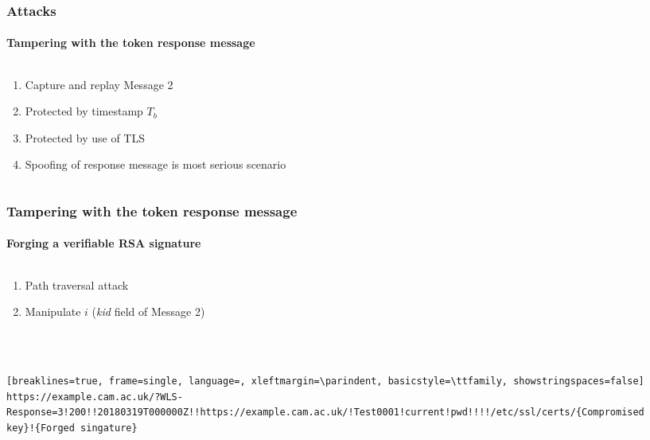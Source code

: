 \documentclass[handout, aspectratio=169, notes=hide]{beamer}
\begin{document}

\begin{frame}
\frametitle{Attacks}
\framesubtitle{Tampering with the token response message}
\setlength{\parskip}{1.0em}
\begin{columns}[T]
\begin{column}[T]{1.0\textwidth}	
\setlength{\parskip}{1.0em}

\begin{enumerate}
\setlength{\parskip}{1.0em}
\item Capture and replay Message 2
\item Protected by timestamp $T_b$
\item Protected by use of TLS
\item Spoofing of response message is most serious scenario
\end{enumerate}
\end{column}

\begin{column}[T]{0.0\textwidth}
\end{column}
\end{columns}

\end{frame}
\note{
}


\begin{frame}[fragile]
\frametitle{Tampering with the token response message}
\framesubtitle{Forging a verifiable RSA signature}
\setlength{\parskip}{1.0em}
\begin{columns}[T]
\begin{column}[T]{1.0\textwidth}	
\setlength{\parskip}{1.0em}

\begin{enumerate}
\setlength{\parskip}{1.0em}
\item Path traversal attack
\item Manipulate $i$ ({\it kid\/} field of Message 2)
\end{enumerate}
\quad \\ \quad \\
\begin{lstlisting}[breaklines=true, frame=single, language=, xleftmargin=\parindent, basicstyle=\ttfamily, showstringspaces=false]
https://example.cam.ac.uk/?WLS-Response=3!200!!20180319T000000Z!!https://example.cam.ac.uk/!Test0001!current!pwd!!!!/etc/ssl/certs/{Compromised key}!{Forged singature}
\end{lstlisting}
\end{column}

\begin{column}[T]{0.0\textwidth}
\end{column}
\end{columns}

\end{frame}
\note{
}
\end{document}
